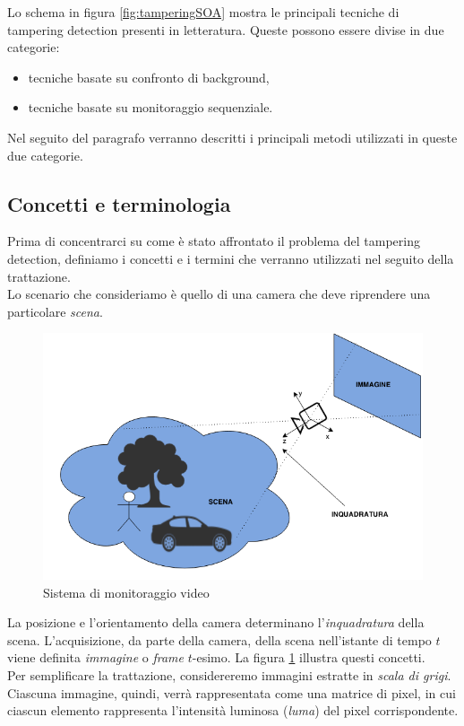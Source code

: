 Lo schema in figura \ref{fig:tamperingSOA} mostra le principali tecniche di tampering detection presenti in letteratura.
Queste possono essere divise in due categorie: 
\begin{itemize}
	\item tecniche basate su confronto di background,
	\item tecniche basate su monitoraggio sequenziale.
\end{itemize}
Nel seguito del paragrafo verranno descritti i principali metodi utilizzati in queste due categorie.
\subsection{Concetti e terminologia}
\label{concetti}
Prima di concentrarci su come \`e stato affrontato il problema del tampering detection, definiamo i concetti e i termini che verranno utilizzati nel seguito della trattazione.\\
Lo scenario che consideriamo \`e quello di una camera che deve riprendere una particolare \textit{\gls{scena}}.
\begin{figure}[tb]
	\centering
	\includegraphics[width=12cm]{./pictures/videoMonitoring}
	\caption{Sistema di monitoraggio video}
	\label{fig:videoMonitoring}
\end{figure}
\noindent 
La posizione e l'orientamento della camera determinano l'\textit{\gls{inquadratura}} della scena.
L'acquisizione, da parte della camera, della scena nell'istante di tempo $t$ viene definita \textit{immagine} o \textit{frame} $t$-esimo.
La figura \ref{fig:videoMonitoring} illustra questi concetti.\\
Per semplificare la trattazione, considereremo immagini estratte in \textit{scala di grigi}.
Ciascuna immagine, quindi, verr\`a rappresentata come una matrice di pixel, in cui ciascun elemento rappresenta l'intensit\`a luminosa (\textit{luma}) del pixel corrispondente.
